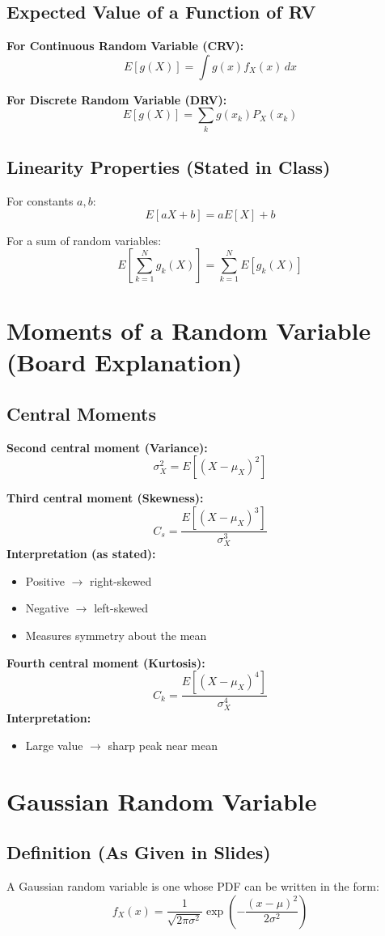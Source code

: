 \documentclass[11pt]{article}
\begin{document}
\subsection{Expected Value of a Function of RV}
\textbf{For Continuous Random Variable (CRV):}
\[ E[g(X)] = \int g(x)f_X(x) \, dx \]

\textbf{For Discrete Random Variable (DRV):}
\[ E[g(X)] = \sum_k g(x_k)P_X(x_k) \]

\subsection{Linearity Properties (Stated in Class)}
For constants $a, b$:
\[ E[aX + b] = aE[X] + b \]

For a sum of random variables:
\[ E\left[\sum_{k=1}^{N} g_k(X)\right] = \sum_{k=1}^{N} E[g_k(X)] \]

\section{Moments of a Random Variable (Board Explanation)}

\subsection{Central Moments}
\textbf{Second central moment (Variance):}
\[ \sigma_X^2 = E[(X - \mu_X)^2] \]

\textbf{Third central moment (Skewness):}
\[ C_s = \frac{E[(X - \mu_X)^3]}{\sigma_X^3} \]
\textbf{Interpretation (as stated):}
\begin{itemize}
    \item Positive $\to$ right-skewed
    \item Negative $\to$ left-skewed
    \item Measures symmetry about the mean
\end{itemize}

\textbf{Fourth central moment (Kurtosis):}
\[ C_k = \frac{E[(X - \mu_X)^4]}{\sigma_X^4} \]
\textbf{Interpretation:}
\begin{itemize}
    \item Large value $\to$ sharp peak near mean
\end{itemize}

\section{Gaussian Random Variable}

\subsection{Definition (As Given in Slides)}
A Gaussian random variable is one whose PDF can be written in the form:
\[ f_X(x) = \frac{1}{\sqrt{2\pi\sigma^2}} \exp\left( -\frac{(x-\mu)^2}{2\sigma^2} \right) \]
\end{document}
